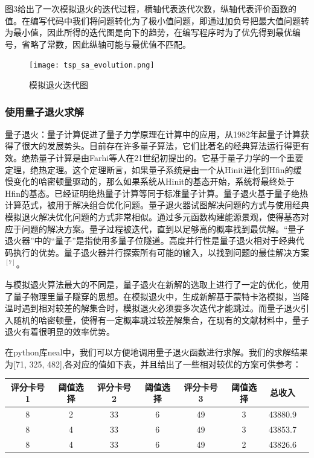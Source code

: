 \documentclass{MathorCupmodeling}
\begin{document}
图3给出了一次模拟退火的迭代过程，横轴代表迭代次数，纵轴代表评价函数的值。在编写代码中我们将问题转化为了极小值问题，即通过加负号把最大值问题转为最小值，因此所得的迭代图是向下的趋势，在编写程序时为了优先得到最优编号，省略了常数，因此纵轴可能与最优值不匹配。
\begin{figure}[ht]
  \centering
  \texttt{[image: tsp\_sa\_evolution.png]}
  \caption{模拟退火迭代图}
  \label{fig:my_label}
\end{figure}
\subsubsection{使用量子退火求解}
量子退火：量子计算促进了量子力学原理在计算中的应用，从1982年起量子计算获得了很大的发展势头。目前存在许多量子算法，它们比著名的经典算法运行得更有效。绝热量子计算是由Farhi等人在21世纪初提出的。它基于量子力学的一个重要定理，绝热定理。这个定理断言，如果量子系统是由一个从Hinit进化到Hfin的缓慢变化的哈密顿量驱动的，那么如果系统从Hinit的基态开始，系统将最终处于Hfin的基态。已经证明绝热量子计算等同于标准量子计算。量子退火基于量子绝热计算范式，被用于解决组合优化问题。量子退火器试图解决问题的方式与使用经典模拟退火解决优化问题的方式非常相似。通过多元函数构建能源景观，使得基态对应于问题的解决方案。量子过程被迭代，直到以足够高的概率找到最优解。“量子退火器”中的“量子”是指使用多量子位隧道。高度并行性是量子退火相对于经典代码执行的优势。量子退火器并行探索所有可能的输入，以找到问题的最佳解决方案$^{[7]}$。

与模拟退火算法最大的不同是，量子退火在新解的选取上进行了一定的优化，使用了量子物理里量子隧穿的思想。在模拟退火中，生成新解基于蒙特卡洛模拟，当降温时遇到相对较差的解集合时，模拟退火必须要多次迭代才能跳过。而量子退火引入随机的哈密顿量，使得有一定概率跳过较差解集合，在现有的文献材料中，量子退火有着很明显的效率优势。

在python库neal中，我们可以方便地调用量子退火函数进行求解。我们的求解结果为[71, 325, 482],各对应的值如下表，并且给出了一些相对较优的方案可供参考：
\begin{center}
 \begin{tabular}{cccccccc}
   \toprule
   评分卡号1 & 阈值选择 & 评分卡号2 & 阈值选择 & 评分卡号3& 阈值选择 & 总收入  \\
   \midrule
    8 &2 &33 &6 &49&3 & 43880.9\\
    8 &4 &33 &6 &49&3 & 43853.7\\
8 &4 &33 &6 &49&2 & 43826.6\\
    \bottomrule
   \end{tabular}
   \end{center}
\end{document}
